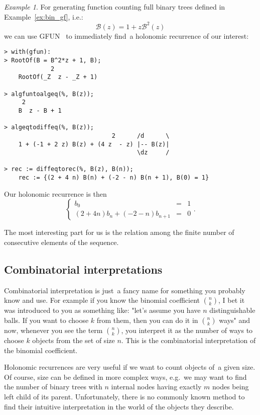\documentclass[final]{article}
\theoremstyle{definition}
\theoremstyle{definition}
\theoremstyle{remark}
\newtheorem{example}{Example}[subsection]
\newcommand{\gf}[1]{\ensuremath{\mathcal{#1}}}
\begin{document}
\begin{example}
    \label{ex:gfun-rec}
    For generating function counting full binary trees defined in Example~\ref{ex:bin_gf}, i.e.:
    \[\gf{B}(z) = 1 + z\gf{B}^2(z)\]
    we can use GFUN~\cite{gfun} to immediately find~a holonomic recurrence of our interest:

    \begin{lstlisting}
> with(gfun):
> RootOf(B = B^2*z + 1, B);
             2
    RootOf(_Z  z - _Z + 1)

> algfuntoalgeq(%, B(z));
     2
    B  z - B + 1

> algeqtodiffeq(%, B(z));
                              2      /d      \
    1 + (-1 + 2 z) B(z) + (4 z  - z) |-- B(z)|
                                     \dz     /

> rec := diffeqtorec(%, B(z), B(n));
    rec := {(2 + 4 n) B(n) + (-2 - n) B(n + 1), B(0) = 1}
    \end{lstlisting}

    Our holonomic recurrence is then
    \[\left\{\begin{array}{rcl}
                b_0 &=& 1\\
                (2 + 4 n) b_n + (-2 - n) b_{n + 1} &=& 0
    \end{array}\right. .\]

    The most interesting part for us is the relation among the finite number of consecutive elements of the sequence.
\end{example}

\subsection{Combinatorial interpretations}%
\label{sub:combinatorial_interpretations}

Combinatorial interpretation is just~a fancy name for something you probably know and use. For example if you know the binomial coefficient \(\binom{n}{k}\), I bet it was introduced to you as something like: "let's assume you have \(n\) distinguishable balls. If you want to choose \(k\) from them, then you can do it in \(\binom{n}{k}\) ways" and now, whenever you see the term \(\binom{n}{k}\), you interpret it as the number of ways to choose \(k\) objects from the set of size \(n\). This is the combinatorial interpretation of the binomial coefficient.

Holonomic recurrences are very useful if we want to count objects of~a given size. Of course, size can be defined in more complex ways, e.g.~we may want to find the number of binary trees with \(n\) internal nodes having exactly \(m\) nodes being left child of its parent. Unfortunately, there is no commonly known method to find their intuitive interpretation in the world of the objects they describe.
\end{document}

